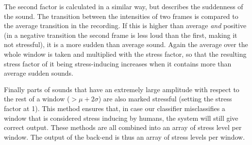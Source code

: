 The second factor is calculated in a similar way, but describes the suddenness of the sound. The transition between the intensities of two frames is compared to the average transition in the recording. If this is higher than average \textit{and} positive (in a negative transition the second frame is less loud than the first, making it not stressful), it is a more sudden than average sound. Again the average over the whole window is taken and multiplied with the stress factor, so that the resulting stress factor of it being stress-inducing increases when it contains more than average sudden sounds.

Finally parts of sounds that have an extremely large amplitude with respect to the rest of a window ($>\mu + 2\sigma$) are also marked stressful (setting the stress factor at 1). This method ensures that, in case our classifier misclassifies a window that is considered stress inducing by humans, the system will still give correct output. These methods are all combined into an array of stress level per window. The output of the back-end is thus an array of stress levels per window.

